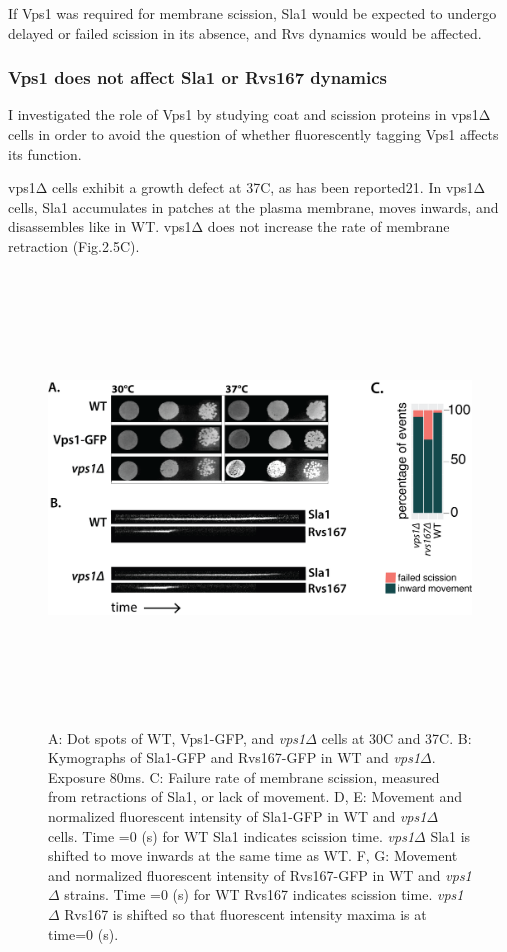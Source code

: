 \newpage
If Vps1 was required for membrane scission, Sla1 would be expected to undergo delayed or failed scission in its absence, and Rvs dynamics would be affected. 


	
			\subsubsection{Vps1 does not affect Sla1 or Rvs167 dynamics }
	\vspace{5mm}
I investigated the role of Vps1 by studying coat and scission proteins in vps1Δ cells in order to avoid the question of whether fluorescently tagging Vps1 affects its function. 

vps1Δ cells exhibit a growth defect at 37C, as has been reported21. In vps1Δ cells, Sla1 accumulates in patches at the plasma membrane, moves inwards, and disassembles like in WT. vps1Δ does not increase the rate of membrane retraction (Fig.2.5C). 

	\begin{figure}
	\centering
	\includegraphics[width=12cm,height=12cm,keepaspectratio]{figures/results_final/vps1}
	\caption[Rvs localization in vps deletion]
	{A: Dot spots of WT, Vps1-GFP, and \textit{vps1$\Delta$} cells at 30C and 37C. 
		B: Kymographs of Sla1-GFP and Rvs167-GFP in WT and \textit{vps1$\Delta$}. Exposure 80ms.  
		C: Failure rate of membrane scission, measured from retractions of Sla1, or lack of movement. 
		D, E: Movement and normalized fluorescent intensity of Sla1-GFP in WT and \textit{vps1$\Delta$} cells. Time =0 (s) for WT Sla1 indicates scission time. \textit{vps1$\Delta$} Sla1  is shifted to move inwards at the same time as WT. 
		F, G: Movement and normalized fluorescent intensity of Rvs167-GFP in WT and \textit{vps1$\Delta$} strains. Time =0 (s) for WT Rvs167 indicates scission time. \textit{vps1$\Delta$} Rvs167 is shifted so that fluorescent intensity maxima is at time=0 (s).
		\label{fig4_vpsdel}}
\end{figure}

